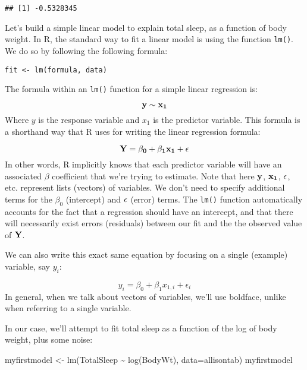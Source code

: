 \documentclass[
]{book}
\newenvironment{Shaded}{\begin{snugshade}}{\end{snugshade}}
\newcommand{\AttributeTok}[1]{\textcolor[rgb]{0.77,0.63,0.00}{#1}}
\newcommand{\FunctionTok}[1]{\textcolor[rgb]{0.00,0.00,0.00}{#1}}
\newcommand{\NormalTok}[1]{#1}
\newcommand{\OtherTok}[1]{\textcolor[rgb]{0.56,0.35,0.01}{#1}}
\newcommand{\SpecialCharTok}[1]{\textcolor[rgb]{0.00,0.00,0.00}{#1}}
\newcommand{\StringTok}[1]{\textcolor[rgb]{0.31,0.60,0.02}{#1}}
\begin{document}
\begin{Shaded}
\end{Shaded}

\begin{verbatim}
## [1] -0.5328345
\end{verbatim}

Let's build a simple linear model to explain total sleep, as a function of body weight. In R, the standard way to fit a linear model is using the function \texttt{lm()}. We do so by following the following formula:

\texttt{fit\ \textless{}-\ lm(formula,\ data)}

The formula within an \texttt{lm()} function for a simple linear regression is:

\[\bf{y} \sim \bf{x_1}\]
Where \(y\) is the response variable and \(x_1\) is the predictor variable. This formula is a shorthand way that R uses for writing the linear regression formula:

\[\bf{Y} = \beta_0 + \beta_1 \bf{x_1} + \bf{\epsilon}\]
In other words, R implicitly knows that each predictor variable will have an associated \(\beta\) coefficient that we're trying to estimate. Note that here \(\bf{y}\), \(\bf{x_1}\), \(\bf{\epsilon}\), etc. represent lists (vectors) of variables. We don't need to specify additional terms for the \(\beta_0\) (intercept) and \(\bf{\epsilon}\) (error) terms. The \texttt{lm()} function automatically accounts for the fact that a regression should have an intercept, and that there will necessarily exist errors (residuals) between our fit and the the observed value of \(\bf{Y}\).

We can also write this exact same equation by focusing on a single (example) variable, say \(y_i\):

\[y_i = \beta_0 + \beta_1 x_{1,i} + \epsilon_i\]
In general, when we talk about vectors of variables, we'll use boldface, unlike when referring to a single variable.

In our case, we'll attempt to fit total sleep as a function of the log of body weight, plus some noise:

\begin{Shaded}
\begin{Highlighting}[]
\NormalTok{myfirstmodel }\OtherTok{\textless{}{-}} \FunctionTok{lm}\NormalTok{(TotalSleep }\SpecialCharTok{\textasciitilde{}} \FunctionTok{log}\NormalTok{(BodyWt), }\AttributeTok{data=}\NormalTok{allisontab) }
\NormalTok{myfirstmodel}
\end{Highlighting}
\end{Shaded}
\end{document}
